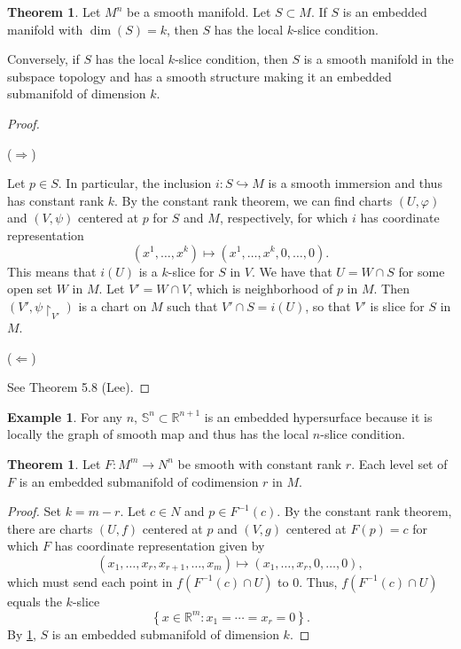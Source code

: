 \documentclass[10pt,letterpaper,cm]{nupset}
\theoremstyle{definition}
\newtheorem{exmp}[definition]{Example}
\theoremstyle{theorem}
\newtheorem{theorem}[definition]{Theorem}
\theoremstyle{remark}
\newcommand{\R}{\mathbb R}
\renewcommand{\S}{\mathbb S}
\newcommand{\1}{\mathbf{1}}
\newcommand{\0}{\vec 0}
\begin{document}
\begin{theorem}\label{slice}
Let $M^n$ be a smooth manifold. Let  $S\subset M$. If $S$ is an embedded manifold with $\dim(S) = k$, then $S$ has the local $k$-slice condition. 

Conversely, if $S$ has the local $k$-slice condition, then $S$ is a smooth manifold in the subspace topology and has a smooth structure making it an embedded submanifold of dimension $k$.
\end{theorem}
\begin{proof}$ $
\smallskip

($\Longrightarrow$)

Let $p\in S$. In particular, the inclusion $i : S\hookrightarrow M$ is a smooth immersion and thus has constant rank $k$. By the constant rank theorem, we can find charts $\left(U, \varphi\right)$ and $\left(V, \psi\right)$ centered at $p$ for $S$ and $M$, respectively, for which $i$ has coordinate representation
\[
\left(x^1, \ldots, x^k\right) \mapsto \left(x^1, \ldots, x^k, 0, \ldots, 0\right).
\] This means that $ i(U)$ is a $k$-slice for $S$ in $V$. We have that $U = W  \cap S$ for some open set $W$ in $M$. Let $V' = W \cap V$, which is neighborhood of $p$ in  $M$. Then  $\left(V', \psi\restriction_{V'}\right)$ is a chart on $M$ such that $V' \cap S = i(U)$, so that $V'$ is slice for $S$ in $M$.

\medskip

($\Longleftarrow$)

See Theorem 5.8 (Lee).

\end{proof}

\begin{exmp}
For any $n$, $\S^n \subset \R^{n+1}$ is an embedded hypersurface because it is locally the graph of smooth map and thus has the local $n$-slice condition.
\end{exmp}

\begin{theorem}\label{lset}
Let $F: M^m \to N^n$ be smooth with constant rank $r$. Each level set of $F$ is an embedded submanifold of codimension $r$ in $M$.
\end{theorem}
\begin{proof}
Set $k = m -r$. Let $c \in N$ and $p \in F^{-1}(c)$. By the constant rank theorem, there are charts $(U, f)$ centered at $p$ and $(V, g)$ centered at $F(p) = c$ for which $F$ has coordinate representation given by $$\left(x_1, \ldots, x_r, x_{r+1}, \ldots, x_m\right) \mapsto \left(x_1, \ldots, x_r, 0, \ldots, 0\right),$$ which must send each point in $f(F^{-1}(c) \cap U)$ to $0$.  Thus, $f(F^{-1}(c) \cap U)$ equals the $k$-slice $$\left\{x \in \R^m : x_1 = \cdots = x_r = 0\right\}.$$ By \cref{slice}, $S$ is an embedded submanifold of dimension $k$.
\end{proof}
\end{document}
